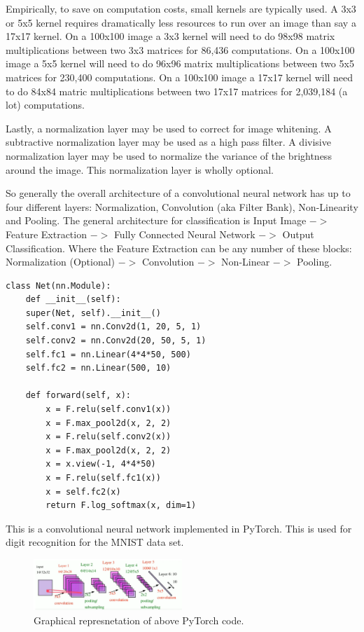 Empirically, to save on computation costs, small kernels are typically used.
A 3x3 or 5x5 kernel requires dramatically less resources to run over an image than say a 17x17 kernel.
On a 100x100 image a 3x3 kernel will need to do 98x98 matrix multiplications between two 3x3 matrices for 86,436 computations.
On a 100x100 image a 5x5 kernel will need to do 96x96 matrix multiplications between two 5x5 matrices for 230,400 computations.
On a 100x100 image a 17x17 kernel will need to do 84x84 matric multiplications between two 17x17 matrices for 2,039,184 (a lot) computations.

Lastly, a normalization layer may be used to correct for image whitening.
A subtractive normalization layer may be used as a high pass filter.
A divisive normalization layer may be used to normalize the variance of the brightness around the image.
This normalization layer is wholly optional.

So generally the overall architecture of a convolutional neural network has up to four different layers: Normalization, Convolution (aka Filter Bank), Non-Linearity and Pooling.
The general architecture for classification is Input Image $->$ Feature Extraction $->$ Fully Connected Neural Network $->$ Output Classification. 
Where the Feature Extraction can be any number of these blocks: Normalization (Optional) $->$ Convolution $->$ Non-Linear $->$ Pooling.

\begin{verbatim}
class Net(nn.Module):
    def __init__(self):
    super(Net, self).__init__()
    self.conv1 = nn.Conv2d(1, 20, 5, 1)
    self.conv2 = nn.Conv2d(20, 50, 5, 1)
    self.fc1 = nn.Linear(4*4*50, 500)
    self.fc2 = nn.Linear(500, 10)
    
    def forward(self, x):
        x = F.relu(self.conv1(x))
        x = F.max_pool2d(x, 2, 2)
        x = F.relu(self.conv2(x))
        x = F.max_pool2d(x, 2, 2)
        x = x.view(-1, 4*4*50)
        x = F.relu(self.fc1(x))
        x = self.fc2(x)
        return F.log_softmax(x, dim=1)
\end{verbatim}

This is a convolutional neural network implemented in PyTorch. This is used for
digit recognition for the MNIST data set. 

\begin{figure}[ht]
  \centering
      \includegraphics[width=0.5\textwidth]{figs/PyTorchCNN.png}
          \caption{Graphical represnetation of above PyTorch code.}
\end{figure}

